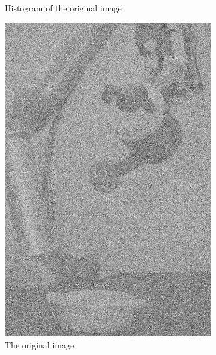 \begin{figure}[H]
\begin{subfigure}[b]{0.16\textwidth}
        \caption{Histogram of the original image}
        \label{fig:img2_hist}
    \end{subfigure}	
    
    
      \begin{subfigure}[b]{0.16\textwidth}
        \includegraphics[width=\textwidth]{img2/src.png}
        \caption{The original image}
        \label{fig:img2_src}
    \end{subfigure}
    \begin{subfigure}[b]{0.16\textwidth}

\end{subfigure}
\end{figure}
